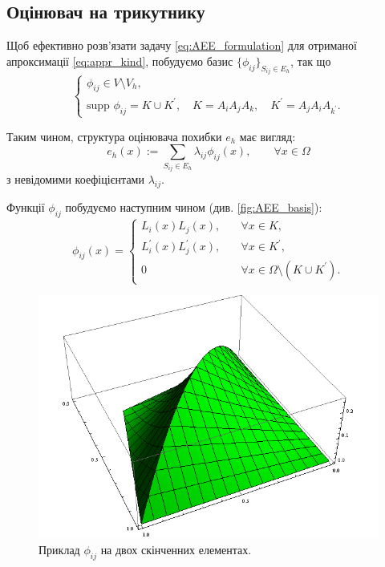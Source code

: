 
\subsection{Оцінювач на трикутнику}

Щоб ефективно розв'язати задачу
\eqref{eq:AEE_formulation} для отриманої апроксимації \eqref{eq:appr_kind}, побудуємо базис $\lbrace \phi_{ij} \rbrace_{S_{ij} \in E_h}$, так що
%
\begin{equation}\label{eq:basis_properties}
\begin{cases}
	\phi_{ij} \in V \setminus V_h, \\
	\text{supp } \phi_{ij} = K \cup K^\prime, \quad K = A_iA_jA_k, \quad K^\prime = A_jA_iA_{k^\prime}.
\end{cases}
\end{equation}

Таким чином, структура оцінювача похибки $e_h$ має вигляд:
%
\begin{equation}
	e_h(x) := \sum \limits_{S_{ij} \in E_h} \lambda_{ij} \phi_{ij}(x), \qquad \forall x \in \Omega
\end{equation}
%
з невідомими коефіцієнтами $\lambda_{ij}$.

Функції $\phi_{ij}$ побудуємо наступним чином (див. \autoref{fig:AEE_basis}):
%
\begin{equation}
	\phi_{ij}(x) =
	\begin{cases}
		L_i(x)L_j(x), &\quad \forall x \in K ,\\
		L_i^\prime(x)L_j^\prime(x), &\quad \forall x \in K^\prime ,\\
		0 &\quad \forall x \in \Omega \setminus (K \cup K^\prime).
	\end{cases}
\end{equation}
%
\begin{figure}[H]
	\centering
    \includegraphics[scale=0.7]{images/basis}
    \caption{Приклад $\phi_{ij}$ на двох скінченних елементах.}
    \label{fig:AEE_basis}
\end{figure}

